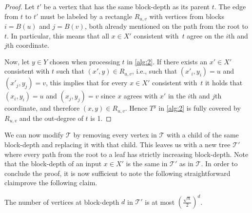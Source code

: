 \documentclass[10pt,a4paper]{article}
\theoremstyle{definition}
\theoremstyle{remark}
\theoremstyle{example}
\theoremstyle{plain}
\newcommand{\calT}{\mathcal{T}}
\begin{document}
{}{
    \begin{proof}
        Let $t'$ be a vertex that has the same block-depth as its parent $t$. The edge from $t$ to $t'$ must be labeled by a rectangle $R_{u,v}$ with vertices from blocks $i=B(u)$ and $j=B(v)$, both already mentioned on the path from the root to $t$. In particular, this means that all $x\in X'$ consistent with~$t$ agree on the $i$th and $j$th coordinate. 
        
        Now, let $y \in Y$ chosen when processing $t$ in \autoref{alg:2}. 
        If there exists an $x'\in X'$ consistent with $t$ such that $(x',y) \in R_{u,v}$, i.e., such that $(x'_i,y_i) = u$ and $(x'_j,y_j) = v$, this implies that for every $x\in X'$ consistent with~$t$ it holds that $(x_i,y_i) = u$ and $(x_j,y_j) = v$ since $x$ agrees with $x'$ in the  $i$th and $j$th coordinate, and therefore $(x,y) \in R_{u,v}$. Hence $T^y$ in \autoref{alg:2} is fully covered by $R_{u,v}$ and the out-degree of $t$ is 1.
    \end{proof}
}

    We can now modify $\calT$ by removing every vertex in $\calT$ with a child of the same block-depth and replacing it with that child. This leaves us with a new tree $\calT '$ where every path from the root to a leaf has strictly increasing block-depth. Note that the block-depth of an input $x\in X'$ is the same in $\mathcal{T}'$ as in $\mathcal{T}$. 
    In order to conclude the proof, it is now sufficient to 
{note the following straightforward claim}{prove the following claim}.
    
\begin{claim}
    \label{claim:size-bound}
    The number of vertices at block-depth $d$ in $\calT '$ is at most $\left(\frac{\sqrt{n}}{2}\right)^d$. 
\end{claim}
\end{document}
